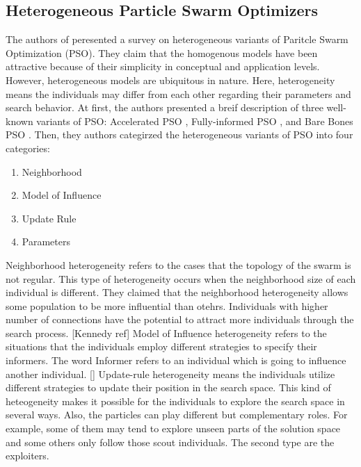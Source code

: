 \subsection{Heterogeneous Particle Swarm Optimizers}
The authors of \cite{de2009heterogeneous} peresented a survey on heterogeneous variants of Paritcle Swarm Optimization (PSO). They claim that the homogenous models have been attractive because of their simplicity in conceptual and application levels. However, heterogeneous models are ubiquitous in nature. Here, heterogeneity means the individuals may differ from each other regarding their parameters and search behavior. \newline 
At first, the authors presented a breif description of three well-known variants of PSO: Accelerated PSO \cite{zhang2003adaptive}, Fully-informed PSO \cite{mendes2004fully}, and Bare Bones PSO \cite{kennedy2003bare}. Then, they authors categirzed the heterogeneous variants of PSO into four categories:
\begin{enumerate}
	\item Neighborhood
	\item Model of Influence
	\item Update Rule
	\item Parameters
\end{enumerate}
Neighborhood heterogeneity refers to the cases that the topology of the swarm is not regular. This type of heterogeneity occurs when the neighborhood size of each individual is different. They claimed that the neighborhood heterogeneity allows some population to be more influential than otehrs. Individuals with higher number of connections have the potential to attract more individuals through the search process. [Kennedy ref]\newline
Model of Influence heterogeneity refers to the situations that the individuals employ different strategies to specify their informers. The word Informer refers to an individual which is going to influence another individual. []\newline
Update-rule heterogeneity means the individuals utilize different strategies to update their position in the search space. This kind of heteogeneity makes it possible for the individuals to explore the search space in several ways. Also, the particles can play different but complementary roles. For example, some of them may tend to explore unseen parts of the solution space and some others only follow those scout individuals. The second type are the exploiters.\newline
